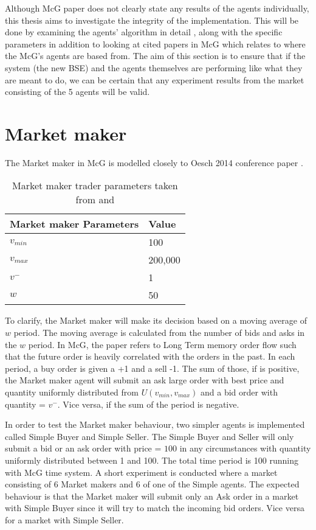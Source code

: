 Although McG paper does not clearly state any results of the agents individually, this thesis aims to investigate the integrity of the implementation. This will be done by examining the agents' algorithm in detail , along with the specific parameters in addition to looking at cited papers in McG which relates to where the McG's agents are based from. The aim of this section is to ensure that if the system (the new BSE) and the agents themselves are performing like what they are meant to do, we can be certain that any experiment results from the market consisting of the 5 agents will be valid. 


\section{Market maker}
The Market maker in McG is modelled closely to Oesch 2014 conference paper \cite{Oesch}. 

\begin{table}[h]
\centering
\begin{tabular}{ |m||p{4cm}|} 
\hline
\textbf{Market maker Parameters}& \textbf{Value} \\
\hline
\hline
$v_{min}$ & 100 \\ 
\hline
$v_{max}$ & 200,000\\ 
\hline
$v^-$ & 1\\ 
\hline
$w$ & 50\\
\hline
\end{tabular}
\caption{Market maker trader parameters taken from \cite{McGroarty} and  \cite{Oesch}} 
\end{table}
\FloatBarrier 

To clarify, the Market maker will make its decision based on a moving average of $w$ period. The moving average is calculated from the number of bids and asks in the $w$ period. In McG, the paper refers to Long Term memory order flow such that the future order is heavily correlated with the orders in the past. In each period, a buy order is given a +1 and a sell -1. The sum of those, if is positive, the Market maker agent will submit an ask large order with best price and quantity uniformly distributed from $U(v_{min},v_{max})$ and a bid order with quantity = $v^-$. Vice versa, if the sum of the period is negative. 

In order to test the Market maker behaviour, two simpler agents is implemented called Simple Buyer and Simple Seller. The Simple Buyer and Seller will only submit a bid or an ask order with price = $100$ in any circumstances with quantity uniformly distributed between 1 and 100. The total time period is 100 running with McG time system. A short experiment is conducted where a market consisting of 6 Market makers and 6 of one of the Simple agents. The expected behaviour is that the Market maker will submit only an Ask order in a market with Simple Buyer since it will try to match the incoming bid orders. Vice versa for a market with Simple Seller. 

